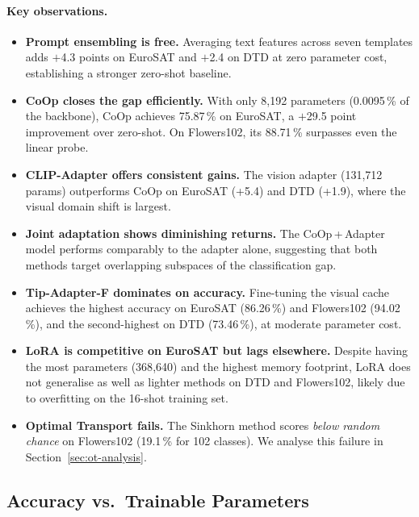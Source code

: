 \documentclass[10pt,twocolumn,letterpaper]{article}
\begin{document}
\paragraph{Key observations.}
\begin{itemize}
  \item \textbf{Prompt ensembling is free.}  Averaging text features across seven templates adds $+$4.3 points on EuroSAT and $+$2.4 on DTD at zero parameter cost, establishing a stronger zero-shot baseline.

  \item \textbf{CoOp closes the gap efficiently.}  With only 8{,}192 parameters (0.0095\,\% of the backbone), CoOp achieves 75.87\,\% on EuroSAT, a $+$29.5 point improvement over zero-shot. On Flowers102, its 88.71\,\% surpasses even the linear probe.

  \item \textbf{CLIP-Adapter offers consistent gains.}  The vision adapter (131{,}712 params) outperforms CoOp on EuroSAT (+5.4) and DTD (+1.9), where the visual domain shift is largest.

  \item \textbf{Joint adaptation shows diminishing returns.} The CoOp\,+\,Adapter model performs comparably to the adapter alone, suggesting that both methods target overlapping subspaces of the classification gap.

  \item \textbf{Tip-Adapter-F dominates on accuracy.}  Fine-tuning the visual cache achieves the highest accuracy on EuroSAT (86.26\,\%) and Flowers102 (94.02\,\%), and the second-highest on DTD (73.46\,\%), at moderate parameter cost.

  \item \textbf{LoRA is competitive on EuroSAT but lags elsewhere.} Despite having the most parameters (368{,}640) and the highest memory footprint, LoRA does not generalise as well as lighter methods on DTD and Flowers102, likely due to overfitting on the 16-shot training set.

  \item \textbf{Optimal Transport fails.}  The Sinkhorn method scores \emph{below random chance} on Flowers102 (19.1\,\% for 102 classes). We analyse this failure in Section~\ref{sec:ot-analysis}.
\end{itemize}


\subsection{Accuracy vs.\ Trainable Parameters}
\end{document}
